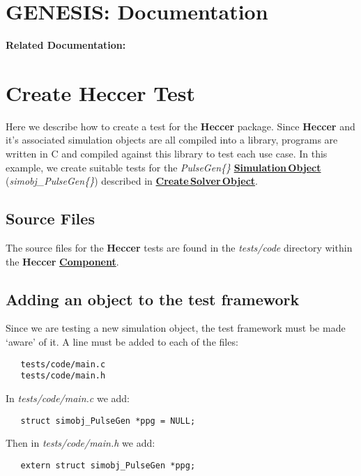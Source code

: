 \documentclass[12pt]{article}
\begin{document}
\section*{GENESIS: Documentation}

{\bf Related Documentation:}

\section*{Create Heccer Test}

Here we describe how to create a test for the {\bf Heccer} package. Since {\bf Heccer} and it's associated simulation objects are all compiled into a library, programs are written in C and compiled against this library to test each use case. In this example, we create suitable tests for the {\it PulseGen\{\}} \href{../simulation-objects/simulation-objects.tex}{\bf Simulation\,Object} ({\it simobj\_PulseGen\{\}}) described in \href{../genesis-add-object-solver/genesis-add-object-solver.tex}{\bf Create\,Solver\,Object}.

\subsection*{Source Files}

The source files for the {\bf Heccer} tests are found in the {\it tests/code} directory within the {\bf Heccer} \href{../reserved-words/reserved-words.tex}{\bf Component}.

\subsection*{Adding an object to the test framework}

Since we are testing a new simulation object, the test framework must be made `aware' of it. A line must be added to each of the files:
\begin{verbatim}
   tests/code/main.c
   tests/code/main.h
\end{verbatim}

In {\it tests/code/main.c} we add:

\begin{verbatim}
   struct simobj_PulseGen *ppg = NULL;
\end{verbatim}

Then in {\it tests/code/main.h} we add:

\begin{verbatim}
   extern struct simobj_PulseGen *ppg;
\end{verbatim}
\end{document}
